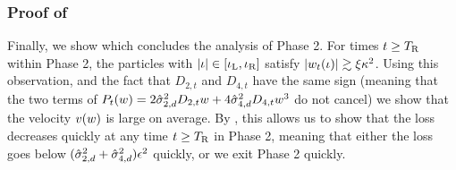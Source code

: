 \subsubsection{Proof of }

Finally, we show  which concludes the analysis of Phase 2. For times $t \geq {T_{\textup{R}}}$ within Phase 2, the particles with $|\iota| \in [\iota_{\textup{L}}, \iota_{\textup{R}}]$ satisfy $|w_t(\iota)| \gtrsim \xi \kappa^2$. Using this observation, and the fact that $D_{2, t}$ and $D_{4, t}$ have the same sign (meaning that the two terms of $P_t(w) = 2 \hat{\sigma}_{2, d}^2 D_{2, t} w + 4 \hat{\sigma}_{4, d}^2 D_{4, t} w^3$ do not cancel) we show that the velocity $v(w)$ is large on average. By , this allows us to show that the loss decreases quickly at any time $t \geq {T_{\textup{R}}}$ in Phase 2, meaning that either the loss goes below $(\hat{\sigma}_{2, d}^2 + \hat{\sigma}_{4, d}^2)\epsilon^2$ quickly, or we exit Phase 2 quickly.

